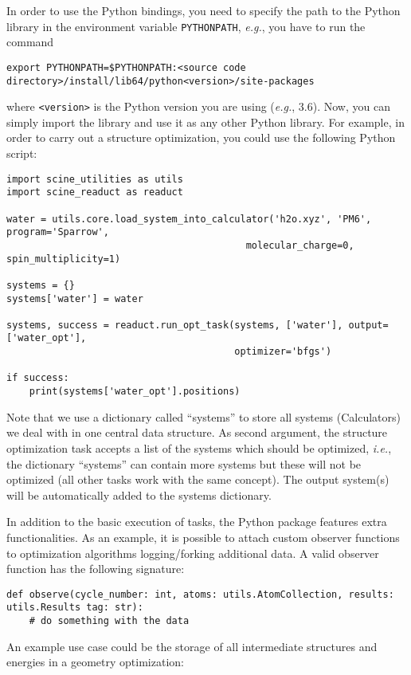 \documentclass[]{tufte-book}
\begin{document}
In order to use the Python bindings, you need to specify the path to the Python library in the environment variable
\texttt{PYTHONPATH}, \textit{e.g.}, you have to run the command
\begin{verbatim}
export PYTHONPATH=$PYTHONPATH:<source code directory>/install/lib64/python<version>/site-packages
\end{verbatim}
where \texttt{<version>} is the Python version you are using (\textit{e.g.}, 3.6). Now, you can simply import the library
and use it as any other Python library. For example, in order to carry out a structure optimization, you could use the
following Python script:
\begin{verbatim}
import scine_utilities as utils
import scine_readuct as readuct

water = utils.core.load_system_into_calculator('h2o.xyz', 'PM6', program='Sparrow',
                                          molecular_charge=0, spin_multiplicity=1)

systems = {}
systems['water'] = water

systems, success = readuct.run_opt_task(systems, ['water'], output=['water_opt'],
                                        optimizer='bfgs')

if success:
    print(systems['water_opt'].positions)
\end{verbatim}
Note that we use a dictionary called ``systems'' to store all systems (Calculators) we deal with in one central data
structure. As second argument, the structure optimization task accepts a list of the systems which should be optimized,
\textit{i.e.}, the dictionary ``systems'' can contain more systems but these will not be optimized (all other tasks
work with the same concept). The output system(s) will be automatically added to the systems dictionary.

In addition to the basic execution of tasks, the Python package features extra functionalities.
As an example, it is possible to attach custom observer functions to optimization algorithms logging/forking additional
data.
A valid observer function has the following signature:

\begin{verbatim}
def observe(cycle_number: int, atoms: utils.AtomCollection, results: utils.Results tag: str):
    # do something with the data
\end{verbatim}

An example use case could be the storage of all intermediate structures and energies in a geometry optimization:
\end{document}
